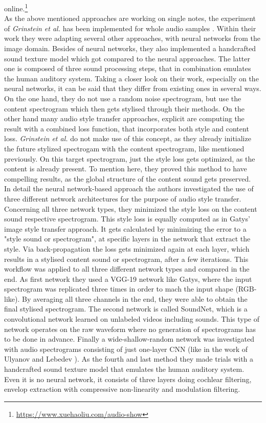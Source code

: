 online.\footnote{\url{https://www.xuehaoliu.com/audio-show}}\\

As the above mentioned approaches are working on single notes, the experiment of \textit{Grinstein et al.} has been implemented for whole audio samples \cite{Grinstein2018}. Within their work they were adapting several other approaches, with neural networks from the image domain. Besides of neural networks, they also implemented a handcrafted sound texture model which got compared to the neural approaches. The latter one is composed of three sound processing steps, that in combination emulates the human auditory system. Taking a closer look on their work, especially on the neural networks, it can be said that they differ from existing ones in several ways. On the one hand, they do not use a random noise spectrogram, but use the content spectrogram which then gets stylised through their methods. On the other hand many audio style transfer approaches, explicit are computing the result with a combined loss function, that incorporates both style and content loss. \textit{Grinstein et al.} do not make use of this concept, as they already initialize the future stylized spectrogam with the content spectrogram, like mentioned previously. On this target spectrogram, just the style loss gets optimized, as the content is already present. To mention here, they proved this method to have compelling results, as the global structure of the content sound gets preserved.\\
In detail the neural network-based approach the authors investigated the use of three different network architectures for the purpose of audio style transfer. Concerning all three network types, they minimized the style loss on the content sound respective spectrogram. This style loss is equally computed as in Gatys' image style transfer approach. It gets calculated by minimizing the error to a "style sound or spectrogram", at specific layers in the network that extract the style. Via back-propagation the loss gets minimized again at each layer, which results in a stylised content sound or spectrogram, after a few iterations. This workflow was applied to all three different network types and compared in the end. As first network they used a VGG-19 network like Gatys, where the input spectrogram was replicated three times in order to mach the input shape (RGB-like). By averaging all three channels in the end, they were able to obtain the final stylised spectrogram. The second network is called SoundNet, which is a convolutional network learned on unlabeled videos including sounds. This type of network operates on the raw waveform where no generation of spectrograms has to be done in advance. Finally a wide-shallow-random network was investigated with audio spectrograms consisting of just one-layer CNN (like in the work of Ulyanov and Lebedev \cite{ulyanov2016audio}). As the fourth and last method they made trials with a handcrafted sound texture model that emulates the human auditory system. Even it is no neural network, it consists of three layers doing cochlear filtering, envelop extraction with compressive non-linearity and modulation filtering.\\
